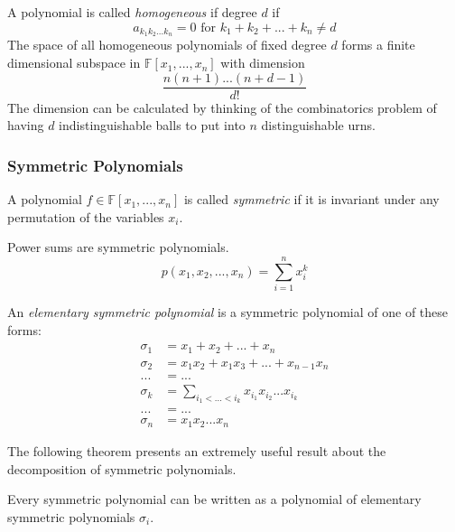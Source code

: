 \documentclass{article}
\begin{document}
      \begin{definition}
        A polynomial is called \textit{homogeneous} if degree $d$ if 
        \[a_{k_1 k_2 ... k_n} = 0 \text{ for } k_1 + k_2 + ... + k_n \neq d\]
        The space of all homogeneous polynomials of fixed degree $d$ forms a finite dimensional subspace in $\mathbb{F}[x_1, ..., x_n]$ with dimension 
        \[\frac{n(n+1)...(n+d-1)}{d!}\]
        The dimension can be calculated by thinking of the combinatorics problem of having $d$ indistinguishable balls to put into $n$ distinguishable urns. 
      \end{definition}

    \subsubsection{Symmetric Polynomials}

      \begin{definition}
        A polynomial $f \in \mathbb{F}[x_1, ..., x_n]$ is called \textit{symmetric} if it is invariant under any permutation of the variables $x_i$. 
      \end{definition}

      \begin{example}
        Power sums are symmetric polynomials. 
        \[p(x_1, x_2, ..., x_n) = \sum_{i=1}^n x_i^k\]
      \end{example}

      \begin{definition}
        An \textit{elementary symmetric polynomial} is a symmetric polynomial of one of these forms: 
        \begin{align*}
          \sigma_1 & = x_1 + x_2 + ... + x_n \\
          \sigma_2 & = x_1 x_2 + x_1 x_3 + ... + x_{n-1} x_n \\
          ... & = ... \\
          \sigma_k & = \sum_{i_1 < ... < i_k} x_{i_1} x_{i_2} ... x_{i_k} \\
          ... & = ... \\
          \sigma_n & = x_1 x_2 ... x_n
        \end{align*}
      \end{definition}

      The following theorem presents an extremely useful result about the decomposition of symmetric polynomials. 

      \begin{theorem}
        Every symmetric polynomial can be written as a polynomial of elementary symmetric polynomials $\sigma_i$. 
      \end{theorem}
\end{document}
